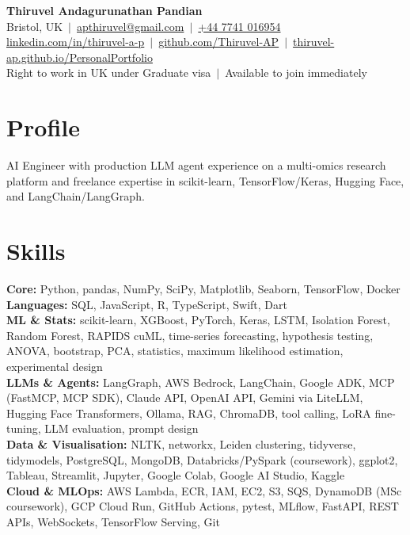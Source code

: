 \documentclass[a4paper,11pt]{article}
\begin{document}
\fontsize{11}{13.2}\selectfont

\begin{center}
  {\LARGE\bfseries Thiruvel Andagurunathan Pandian}\\[3pt]
  Bristol, UK \,$|$\, \href{mailto:apthiruvel@gmail.com}{apthiruvel@gmail.com} \,$|$\, \href{tel:+447741016954}{+44 7741 016954}\\[1pt]
\href{https://www.linkedin.com/in/thiruvel-a-p/}{linkedin.com/in/thiruvel-a-p} \,$|$\, \href{https://github.com/Thiruvel-AP}{github.com/Thiruvel-AP} \,$|$\, \href{https://thiruvel-ap.github.io/PersonalPortfolio/}{thiruvel-ap.github.io/PersonalPortfolio}\\[1pt]
  Right to work in UK under Graduate visa \,$|$\, Available to join immediately
\end{center}

\section{Profile}
AI Engineer with production LLM agent experience on a multi-omics research platform and freelance expertise in scikit-learn, TensorFlow/Keras, Hugging Face, and LangChain/LangGraph.

\section{Skills}
\textbf{Core:} Python, pandas, NumPy, SciPy, Matplotlib, Seaborn, TensorFlow, Docker\\[2pt]
\textbf{Languages:} SQL, JavaScript, R, TypeScript, Swift, Dart\\[2pt]
\textbf{ML \& Stats:} scikit-learn, XGBoost, PyTorch, Keras, LSTM, Isolation Forest, Random Forest, RAPIDS cuML, time-series forecasting, hypothesis testing, ANOVA, bootstrap, PCA, statistics, maximum likelihood estimation, experimental design\\[2pt]
\textbf{LLMs \& Agents:} LangGraph, AWS Bedrock, LangChain, Google ADK, MCP (FastMCP, MCP SDK), Claude API, OpenAI API, Gemini via LiteLLM, Hugging Face Transformers, Ollama, RAG, ChromaDB, tool calling, LoRA fine-tuning, LLM evaluation, prompt design\\[2pt]
\textbf{Data \& Visualisation:} NLTK, networkx, Leiden clustering, tidyverse, tidymodels, PostgreSQL, MongoDB, Databricks/PySpark (coursework), ggplot2, Tableau, Streamlit, Jupyter, Google Colab, Google AI Studio, Kaggle\\[2pt]
\textbf{Cloud \& MLOps:} AWS Lambda, ECR, IAM, EC2, S3, SQS, DynamoDB (MSc coursework), GCP Cloud Run, GitHub Actions, pytest, MLflow, FastAPI, REST APIs, WebSockets, TensorFlow Serving, Git
\end{document}
